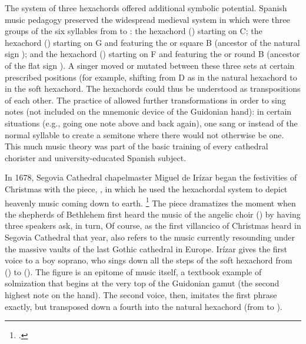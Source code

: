 The system of three hexachords offered additional symbolic potential.
Spanish music pedagogy preserved the widespread medieval system in which were
three groups of the six syllables from  to : the
 hexachord (\XXX[check]) starting on C;
the  hexachord () starting on G and featuring
the  or square B (ancestor of the natural sign \na{}); and the
 hexachord () starting on F and featuring the
 or round B (ancestor of the flat sign \fl{}).
A singer moved or mutated between these three sets at certain prescribed
positions (for example, shifting from D as  in the natural hexachord
to  in the soft hexachord. %
The hexachords could thus be understood as transpositions of each other.
The practice of  allowed further transformations in order
to sing notes  (not included on the mnemonic
device of the Guidonian hand): in certain situations (e.g., going one note
above  and back again), one sang  or  instead of the
normal syllable to create a semitone where there would not otherwise be one.
This much music theory was part of the basic training of every cathedral
chorister and university-educated Spanish subject.%
    \citXXX[sources] %

In 1678, Segovia Cathedral chapelmaster Miguel de Irízar began the festivities
of Christmas with the  piece, , in
which he used the hexachordal system to depict heavenly music coming down to
earth.%
    \footnote{.}
The piece dramatizes the moment when the shepherds of Bethlehem first heard the
music of the angelic choir () by having three speakers ask,
in turn,
%
    \citXXX[wlscm32+]
Of course, as the first villancico of Christmas heard in Segovia Cathedral that
year,  also refers to the music currently resounding under
the massive vaults of the last Gothic cathedral in Europe.
Irízar gives the first voice to a boy soprano, who sings down all the steps of
the soft hexachord from  () to  ().
The figure is an epitome of music itself, a textbook example of solmization
that begins at the very top of the Guidonian gamut (the second highest note on
the hand).
The second voice, then, imitates the first phrase exactly, but transposed down
a fourth into the natural hexachord (from  to ).

